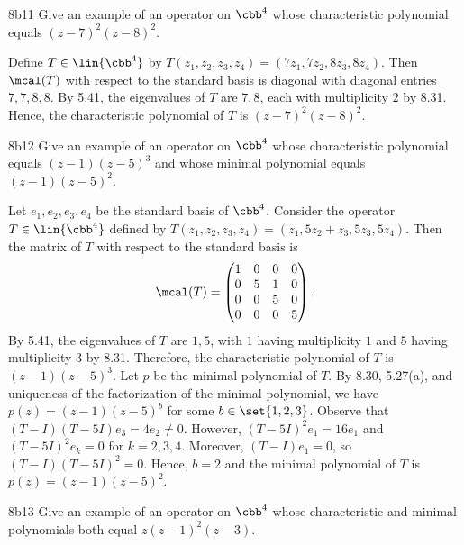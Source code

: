 \begin{exercise}{8b11}
    Give an example of an operator on $\cbb^4$ whose characteristic polynomial equals $(z - 7)^2 (z - 8)^2$.
\end{exercise}

\begin{sol}
    Define $T \in \lin{\cbb^4}$ by $T(z_1, z_2, z_3, z_4) = (7 z_1, 7 z_2, 8 z_3, 8 z_4)$.
    Then $\mcal(T)$ with respect to the standard basis is diagonal with diagonal entries $7, 7, 8, 8$.
    By 5.41, the eigenvalues of $T$ are $7, 8$, each with multiplicity $2$ by 8.31.
    Hence, the characteristic polynomial of $T$ is $(z - 7)^2 (z - 8)^2$.
\end{sol}

\begin{exercise}{8b12}
    Give an example of an operator on $\cbb^4$ whose characteristic polynomial equals $(z - 1)(z - 5)^3$ and whose minimal polynomial equals $(z - 1)(z - 5)^2$.
\end{exercise}

\begin{sol}
    Let $e_1, e_2, e_3, e_4$ be the standard basis of $\cbb^4$.
    Consider the operator $T \in \lin{\cbb^4}$ defined by $T(z_1, z_2, z_3, z_4) = (z_1, 5z_2 + z_3, 5z_3, 5z_4)$.
    Then the matrix of $T$ with respect to the standard basis is
    \[
        \mcal(T) = 
        \begin{pmatrix}
            1 & 0 & 0 & 0 \\
            0 & 5 & 1 & 0 \\
            0 & 0 & 5 & 0 \\
            0 & 0 & 0 & 5
        \end{pmatrix}.
    \]
    By 5.41, the eigenvalues of $T$ are $1, 5$, with $1$ having multiplicity $1$ and $5$ having multiplicity $3$ by 8.31.
    Therefore, the characteristic polynomial of $T$ is $(z - 1)(z - 5)^3$.
    Let $p$ be the minimal polynomial of $T$.
    By 8.30, 5.27(a), and uniqueness of the factorization of the minimal polynomial, we have $p(z) = (z - 1)(z - 5)^b$ for some $b \in \set{1, 2, 3}$.
    Observe that $(T - I)(T - 5I) e_3 = 4 e_2 \neq 0$.
    However, $(T - 5I)^2 e_1 = 16 e_1$ and $(T - 5I)^2 e_k = 0$ for $k = 2, 3, 4$.
    Moreover, $(T - I) e_1 = 0$, so $(T - I)(T - 5I)^2 = 0$.
    Hence, $b = 2$ and the minimal polynomial of $T$ is $p(z) = (z - 1)(z - 5)^2$.
\end{sol}

\begin{exercise}{8b13}
    Give an example of an operator on $\cbb^4$ whose characteristic and minimal polynomials both equal $z(z - 1)^2(z - 3)$.
\end{exercise}

